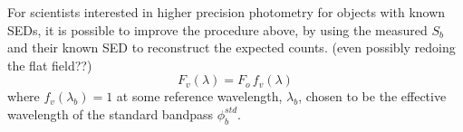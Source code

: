 \documentclass[12pt,preprint]{aastex}
\begin{document}
For scientists interested in higher precision photometry for objects
with known SEDs, it is possible to improve the procedure above, by
using the measured $S_b$ and their known SED to reconstruct the
expected counts. (even possibly redoing the flat field??)
\begin{equation}
F_v(\lambda) = F_o \, f_v(\lambda)
\end{equation}
where $f_v(\lambda_b)=1$ at some reference wavelength, $\lambda_b$,
chosen to be the effective wavelength of the standard bandpass
$\phi_b^{std}$.  





\end{document}
